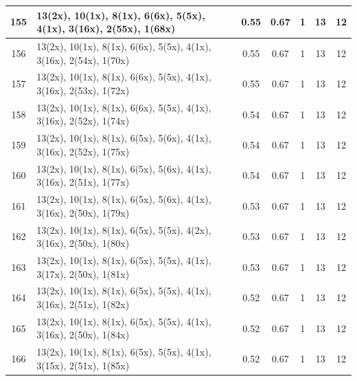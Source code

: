 \begin{small}
\begin{longtable}{|c|p{4cm}|c|c|c|c|c|}
  155 & 13(2x), 10(1x), 8(1x), 6(6x), 5(5x), 4(1x), 3(16x), 2(55x), 1(68x) & \cellcolor{colorGood}  0.55 & \cellcolor{colorGood} 0.67 & 1 & 13 & \cellcolor{colorGood} 12 \\   \hline
  156 & 13(2x), 10(1x), 8(1x), 6(6x), 5(5x), 4(1x), 3(16x), 2(54x), 1(70x) & \cellcolor{colorGood}  0.55 & \cellcolor{colorGood} 0.67 & 1 & 13 & \cellcolor{colorGood} 12 \\   \hline
  157 & 13(2x), 10(1x), 8(1x), 6(6x), 5(5x), 4(1x), 3(16x), 2(53x), 1(72x) & \cellcolor{colorGood}  0.55 & \cellcolor{colorGood} 0.67 & 1 & 13 & \cellcolor{colorGood} 12 \\   \hline
  158 & 13(2x), 10(1x), 8(1x), 6(6x), 5(5x), 4(1x), 3(16x), 2(52x), 1(74x) & \cellcolor{colorGood}  0.54 & \cellcolor{colorGood} 0.67 & 1 & 13 & \cellcolor{colorGood} 12 \\   \hline
  159 & 13(2x), 10(1x), 8(1x), 6(5x), 5(6x), 4(1x), 3(16x), 2(52x), 1(75x) & \cellcolor{colorGood}  0.54 & \cellcolor{colorGood} 0.67 & 1 & 13 & \cellcolor{colorGood} 12 \\   \hline
  160 & 13(2x), 10(1x), 8(1x), 6(5x), 5(6x), 4(1x), 3(16x), 2(51x), 1(77x) & \cellcolor{colorGood}  0.54 & \cellcolor{colorGood} 0.67 & 1 & 13 & \cellcolor{colorGood} 12 \\   \hline
  161 & 13(2x), 10(1x), 8(1x), 6(5x), 5(6x), 4(1x), 3(16x), 2(50x), 1(79x) & \cellcolor{colorGood}  0.53 & \cellcolor{colorGood} 0.67 & 1 & 13 & \cellcolor{colorGood} 12 \\   \hline
  162 & 13(2x), 10(1x), 8(1x), 6(5x), 5(5x), 4(2x), 3(16x), 2(50x), 1(80x) & \cellcolor{colorGood}  0.53 & \cellcolor{colorGood} 0.67 & 1 & 13 & \cellcolor{colorGood} 12 \\   \hline
  163 & 13(2x), 10(1x), 8(1x), 6(5x), 5(5x), 4(1x), 3(17x), 2(50x), 1(81x) & \cellcolor{colorGood}  0.53 & \cellcolor{colorGood} 0.67 & 1 & 13 & \cellcolor{colorGood} 12 \\   \hline
  164 & 13(2x), 10(1x), 8(1x), 6(5x), 5(5x), 4(1x), 3(16x), 2(51x), 1(82x) & \cellcolor{colorGood}  0.52 & \cellcolor{colorGood} 0.67 & 1 & 13 & \cellcolor{colorGood} 12 \\   \hline
  165 & 13(2x), 10(1x), 8(1x), 6(5x), 5(5x), 4(1x), 3(16x), 2(50x), 1(84x) & \cellcolor{colorGood}  0.52 & \cellcolor{colorGood} 0.67 & 1 & 13 & \cellcolor{colorGood} 12 \\   \hline
  166 & 13(2x), 10(1x), 8(1x), 6(5x), 5(5x), 4(1x), 3(15x), 2(51x), 1(85x) & \cellcolor{colorGood}  0.52 & \cellcolor{colorGood} 0.67 & 1 & 13 & \cellcolor{colorGood} 12 \\   \hline

\end{longtable}
\end{small}
